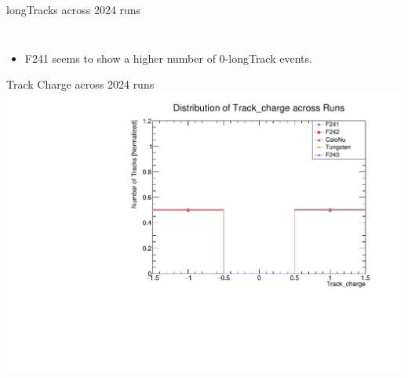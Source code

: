 \begin{frame}{longTracks across 2024 runs}
\begin{columns}
\begin{column}{0.55 \linewidth}
\begin{figure}
			\end{figure}
		\end{column}
	\end{columns}
	\begin{itemize}
		\item F241 seems to show a higher number of 0-longTrack events.
	\end{itemize}
\end{frame}

\begin{frame}{Track Charge across 2024 runs}
	\includegraphics[width=\linewidth]{./RunwisePlots/Track_charge_runwise.pdf}
\end{frame}

